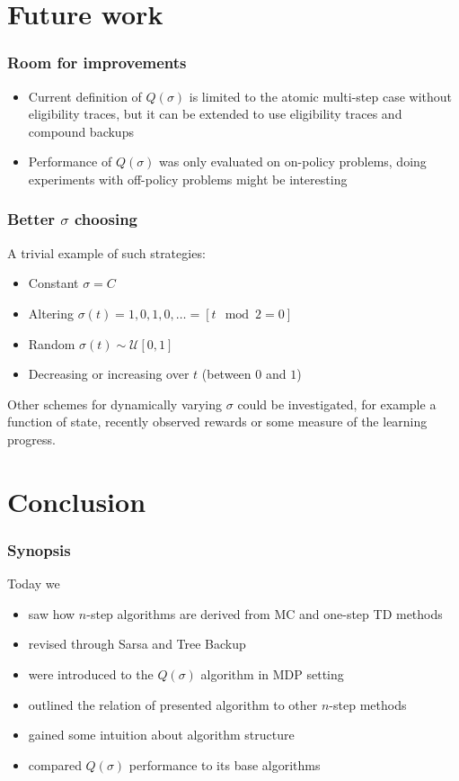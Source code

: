 \documentclass{beamer}
\begin{document}
\section{Future work}

\begin{frame}
  \frametitle{Room for improvements}
  \begin{itemize}
    \item Current definition of $Q(\sigma)$ is limited to the atomic multi-step
      case without eligibility traces, but it can be extended to use
      eligibility traces and compound backups
    \item Performance of $Q(\sigma)$ was only evaluated on on-policy problems,
      doing experiments with off-policy problems might be interesting
  \end{itemize}
\end{frame}

\begin{frame}
  \frametitle{Better $\sigma$ choosing}
  A trivial example of such strategies:
  \begin{itemize}
    \item Constant $\sigma = C$
    \item Altering $\sigma(t) = 1, 0, 1, 0, \ldots = [t \mod 2 = 0]$
    \item Random $\sigma(t) \sim \mathcal{U}[0, 1]$
    \item Decreasing or increasing over $t$ (between $0$ and $1$)
  \end{itemize}
  Other schemes for dynamically varying $\sigma$ could be investigated, for
  example a function of state, recently observed rewards or some measure of the
  learning progress.
\end{frame}

\section{Conclusion}

\begin{frame}
  \frametitle{Synopsis}
  Today we
  \begin{itemize}
    \item saw how $n$-step algorithms are derived from MC and one-step TD
      methods
    \item revised through Sarsa and Tree Backup
    \item were introduced to the $Q(\sigma)$ algorithm in MDP setting
    \item outlined the relation of presented algorithm to other $n$-step methods
    \item gained some intuition about algorithm structure
    \item compared $Q(\sigma)$ performance to its base algorithms
  \end{itemize}
\end{frame}
\end{document}
